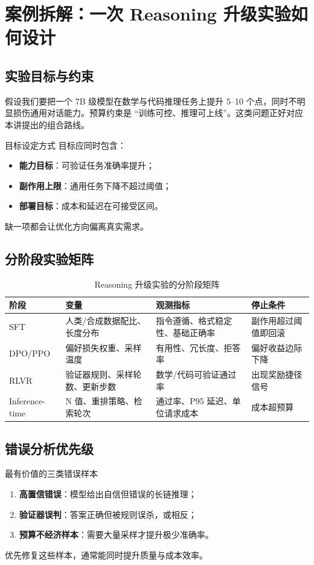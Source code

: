 \documentclass[a4paper]{article}
\begin{document}
\section{案例拆解：一次 Reasoning 升级实验如何设计}

\subsection{实验目标与约束}
假设我们要把一个 7B 级模型在数学与代码推理任务上提升 5--10 个点，同时不明显损伤通用对话能力。预算约束是 ``训练可控、推理可上线''。这类问题正好对应本讲提出的组合路线。

\begin{importantbox}{目标设定方式}
目标应同时包含：
\begin{itemize}
    \item \textbf{能力目标}：可验证任务准确率提升；
    \item \textbf{副作用上限}：通用任务下降不超过阈值；
    \item \textbf{部署目标}：成本和延迟在可接受区间。
\end{itemize}
缺一项都会让优化方向偏离真实需求。
\end{importantbox}

\subsection{分阶段实验矩阵}
\begin{table}[H]
\centering
\renewcommand{\arraystretch}{1.2}
\begin{tabular}{p{2.8cm}p{3.4cm}p{3.8cm}p{3.0cm}}
\toprule
\textbf{阶段} & \textbf{变量} & \textbf{观测指标} & \textbf{停止条件} \\
\midrule
SFT & 人类/合成数据配比、长度分布 & 指令遵循、格式稳定性、基础正确率 & 副作用超过阈值即回滚 \\
DPO/PPO & 偏好损失权重、采样温度 & 有用性、冗长度、拒答率 & 偏好收益边际下降 \\
RLVR & 验证器规则、采样轮数、更新步数 & 数学/代码可验证通过率 & 出现奖励捷径信号 \\
Inference-time & N 值、重排策略、检索轮次 & 通过率、P95 延迟、单位请求成本 & 成本超预算 \\
\bottomrule
\end{tabular}
\caption{Reasoning 升级实验的分阶段矩阵}
\end{table}

\subsection{错误分析优先级}
\begin{knowledgebox}{最有价值的三类错误样本}
\begin{enumerate}
    \item \textbf{高置信错误}：模型给出自信但错误的长链推理；
    \item \textbf{验证器误判}：答案正确但被规则误杀，或相反；
    \item \textbf{预算不经济样本}：需要大量采样才提升极少准确率。
\end{enumerate}
优先修复这些样本，通常能同时提升质量与成本效率。
\end{knowledgebox}
\end{document}
